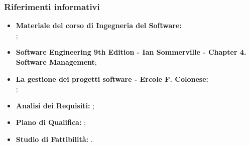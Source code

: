 		\subsubsection{Riferimenti informativi}
			\begin{itemize}
				\item \textbf{Materiale del corso di Ingegneria del Software:} \\
					;
				\item \textbf{Software Engineering 9th Edition - Ian Sommerville - Chapter 4. Software Management};
				\item \textbf{La gestione dei progetti software - Ercole F. Colonese:} \\
					;
				\item \textbf{Analisi dei Requisiti:} ;
				\item \textbf{Piano di Qualifica:} ;
				\item \textbf{Studio di Fattibilità:} .
			\end{itemize}